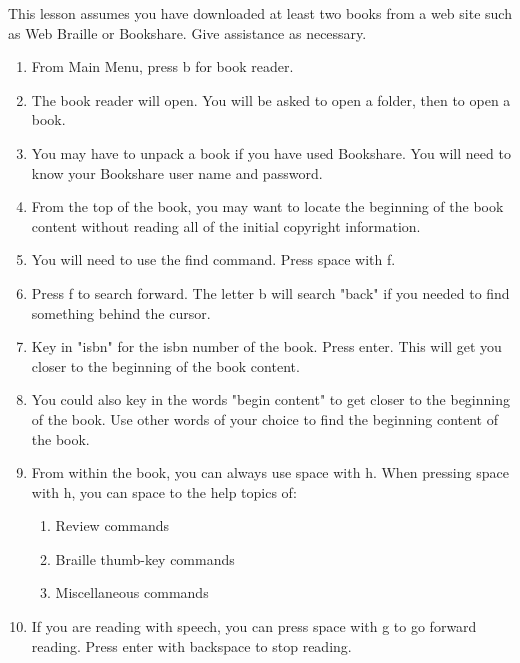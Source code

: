 \documentclass[10pt,letterpaper,twoside]{report}
\begin{document}
{{{{This lesson assumes you have downloaded at least two books from a web site such as Web Braille or Bookshare. Give assistance as necessary.



\begin{enumerate}
	\item From Main Menu, press b for book reader.
	      
	\item The book reader will open.  You will be asked to open a folder, then to open a book.
	      
	\item You may have to unpack a book if you have used Bookshare. You will need to know your Bookshare user name and password.
	      
	\item From the top of the book, you may want to locate the beginning of the book content without reading all of the initial copyright information.
	      
	\item You will need to use the find command.  Press space with f.
	      
	\item Press f to search forward.  The letter b will search "back" if you needed to find something behind the cursor.
	      
	\item Key in "isbn" for the isbn number of the book.  Press enter.  This will get you closer to the beginning of the book content.
	      
	\item You could also key in the words "begin content" to get closer to the beginning of the book.  Use other words of your choice to find the beginning content of the book.
	      
	\item From within the book, you can always use space with h.  When pressing space with h, you can space to the help topics of:
	      
	      \begin{enumerate}
		      \item Review commands
		            
		      \item Braille thumb-key commands
		            
		      \item Miscellaneous commands
		            
		            
	      \end{enumerate}
	\item If you are reading with speech, you can press space with g to go forward reading.  Press enter with backspace to stop reading.
	      

\end{enumerate}}}}}
\end{document}
